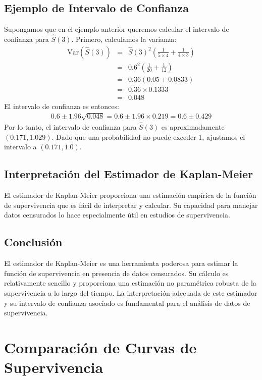 \documentclass[a4paper]{report} %
\begin{document}
\section{Ejemplo de Intervalo de Confianza}
Supongamos que en el ejemplo anterior queremos calcular el intervalo de confianza para $\hat{S}(3)$. Primero, calculamos la varianza:
\begin{eqnarray*}
\text{Var}(\hat{S}(3)) &=& \hat{S}(3)^2 \left( \frac{1}{5 \times 4} + \frac{1}{4 \times 3} \right) \\
                       &=& 0.6^2 \left( \frac{1}{20} + \frac{1}{12} \right) \\
                       &=& 0.36 \left( 0.05 + 0.0833 \right) \\
                       &=& 0.36 \times 0.1333 \\
                       &=& 0.048
\end{eqnarray*}
El intervalo de confianza es entonces:
\begin{eqnarray*}
0.6 \pm 1.96 \sqrt{0.048} = 0.6 \pm 1.96 \times 0.219 = 0.6 \pm 0.429
\end{eqnarray*}
Por lo tanto, el intervalo de confianza para $\hat{S}(3)$ es aproximadamente $(0.171, 1.029)$. Dado que una probabilidad no puede exceder 1, ajustamos el intervalo a $(0.171, 1.0)$.

\section{Interpretaci\'on del Estimador de Kaplan-Meier}
El estimador de Kaplan-Meier proporciona una estimaci\'on emp\'irica de la funci\'on de supervivencia que es f\'acil de interpretar y calcular. Su capacidad para manejar datos censurados lo hace especialmente \'util en estudios de supervivencia.

\section{Conclusi\'on}
El estimador de Kaplan-Meier es una herramienta poderosa para estimar la funci\'on de supervivencia en presencia de datos censurados. Su c\'alculo es relativamente sencillo y proporciona una estimaci\'on no param\'etrica robusta de la supervivencia a lo largo del tiempo. La interpretaci\'on adecuada de este estimador y su intervalo de confianza asociado es fundamental para el an\'alisis de datos de supervivencia.



\chapter{Comparaci\'on de Curvas de Supervivencia}
\end{document}
